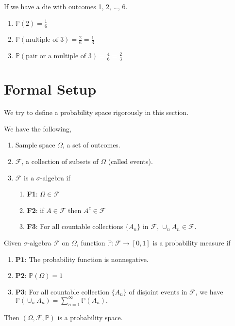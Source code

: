 \begin{eg}
If we have a die with outcomes 1, 2, \ldots, 6. 
\begin{enumerate}
    \item $\mathbb{P}(2) = \frac{1}{6}$
    \item $\mathbb{P}(\text{multiple of }3) = \frac{2}{6} = \frac{1}{3}$
    \item \(\mathbb{P}(\text{pair or a multiple of }3) = \frac{4}{6} = \frac{2}{3}\) 
\end{enumerate}
\end{eg}
\section{Formal Setup}
We try to define a probability space rigorously in this section.
\begin{definition}
    We have the following,
    \begin{enumerate}
        \item Sample space \(\Omega\), a set of outcomes.
        \item \(\mathcal{F}\), a collection of subsets of \(\Omega\) (called events).
        \item \(\mathcal{F}\) is a \(\sigma\)-algebra if
        \begin{enumerate}
            \item \textbf{F1}: \(\Omega\in\mathcal{F} \)
            \item \textbf{F2}: if \(A \in \mathcal{F} \) then \(A^c \in \mathcal{F} \)
            \item \textbf{F3}: For all countable collections \(\{A_n\}\) in \(\mathcal{F} \), \(\cup_n A_n \in \mathcal{F} \).
        \end{enumerate} 
    \end{enumerate}
    Given \(\sigma\)-algebra \(\mathcal{F}\) on \(\Omega\), function $\mathbb{P}: \mathcal{F} \to [0,1]$ is a probability measure if
    \begin{enumerate}
        \item \textbf{P1}: The probability function is nonnegative.
        \item \textbf{P2}: \(\mathbb{P}(\Omega) = 1\) 
        \item \textbf{P3}: For all countable collection \(\{A_n\}\) of disjoint events in \(\mathcal{F} \), we have
        \(
            \mathbb{P}(\cup_n A_n) = \sum\limits_{n=1}^{\infty} \mathbb{P}(A_n).
        \)
    \end{enumerate}
    Then \((\Omega, \mathcal{F}, \mathbb{P})\) is a probability space. 
\end{definition}

